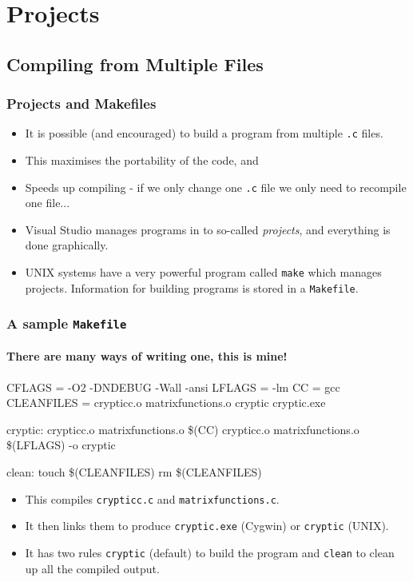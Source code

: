 \documentclass[smaller,table]{beamer} %
\begin{document}
\section{Projects}
\subsection{Compiling from Multiple Files}
\begin{frame}
\frametitle{Projects and Makefiles}
\begin{itemize}
\item It is possible (and encouraged) to build a program from multiple {\tt .c} files.
\item This maximises the portability of the code, and
\item Speeds up compiling - if we only change one {\tt .c} file we only need to recompile one file...
\item Visual Studio manages programs in to so-called \emph{projects}, and everything is done graphically.
\item UNIX systems have a very powerful program called {\tt make} which manages projects. Information for building programs is stored in a {\tt Makefile}.
\end{itemize}
\end{frame}

\begin{frame}[fragile]
\frametitle{A sample {\tt Makefile}}
\framesubtitle{There are many ways of writing one, this is mine!}
\begin{exampleblock}{}
\begin{semiverbatim}
\scriptsize
CFLAGS = -O2 -DNDEBUG -Wall -ansi
LFLAGS = -lm
CC = gcc
CLEANFILES = crypticc.o matrixfunctions.o cryptic cryptic.exe

cryptic: crypticc.o matrixfunctions.o
         \$(CC) crypticc.o matrixfunctions.o \$(LFLAGS) -o cryptic
         
clean:
        touch \$(CLEANFILES)
        rm \$(CLEANFILES)
\end{semiverbatim}
\end{exampleblock}
\begin{itemize}
\item This compiles {\tt crypticc.c} and {\tt matrixfunctions.c}.
\item It then links them to produce {\tt cryptic.exe} (Cygwin) or {\tt cryptic} (UNIX).
\item It has two rules {\tt cryptic} (default) to build the program and {\tt clean} to clean up all the compiled output.
\end{itemize}
\end{frame}
\end{document}
